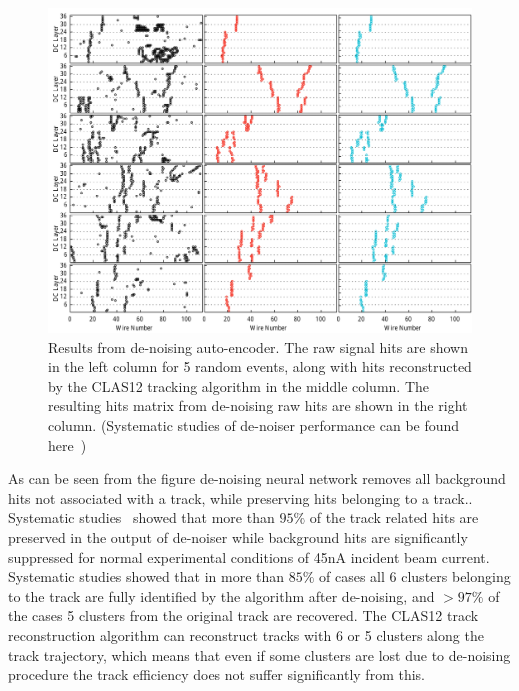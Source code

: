 \begin{figure}[!h]
\begin{center}
 \includegraphics[width=5.8in]{images/cnn_denoise_results.pdf}
\caption {Results from de-noising auto-encoder. The raw signal hits are shown
in the left column for 5 random events, along with hits reconstructed by the 
CLAS12 tracking algorithm in the middle column. The resulting  hits matrix 
from de-noising raw hits are shown in the right column. (Systematic studies 
of de-noiser performance can be found here~\cite{Thomadakis:2022zcd})}
 \label{network:cnn_results}
 \end{center}
\end{figure}

As can be seen from the figure de-noising neural network removes all background hits not 
associated with a track, while preserving hits belonging to a track.. 
Systematic studies~\cite{Thomadakis:2022zcd} showed that more than 
$95\%$ of the track related hits are preserved in the output of de-noiser while 
background hits are significantly suppressed for normal experimental conditions of 45nA
incident beam current. Systematic studies showed that in more than $85\%$ of cases all 
6 clusters belonging to the track are fully identified by the algorithm after de-noising, 
and $>97\%$ of the cases 5 clusters from the original track are recovered. The CLAS12 
track reconstruction algorithm can reconstruct tracks with 6 or 5 clusters along the 
track trajectory, which means that even if some clusters are lost due to de-noising 
procedure the track efficiency does not suffer significantly from this.

